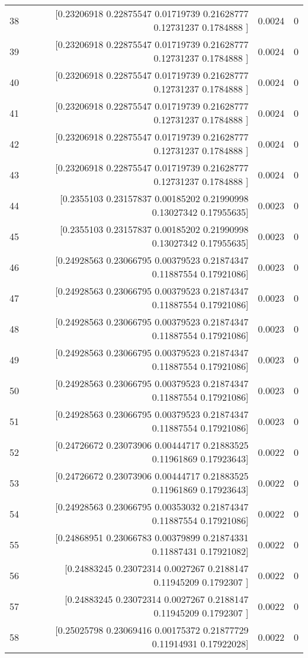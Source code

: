 \begin{longtable}{lrrr}
38 & [0.23206918 0.22875547 0.01719739 0.21628777 0.12731237 0.1784888 ] & 0.0024 & 0 \\
39 & [0.23206918 0.22875547 0.01719739 0.21628777 0.12731237 0.1784888 ] & 0.0024 & 0 \\
40 & [0.23206918 0.22875547 0.01719739 0.21628777 0.12731237 0.1784888 ] & 0.0024 & 0 \\
41 & [0.23206918 0.22875547 0.01719739 0.21628777 0.12731237 0.1784888 ] & 0.0024 & 0 \\
42 & [0.23206918 0.22875547 0.01719739 0.21628777 0.12731237 0.1784888 ] & 0.0024 & 0 \\
43 & [0.23206918 0.22875547 0.01719739 0.21628777 0.12731237 0.1784888 ] & 0.0024 & 0 \\
44 & [0.2355103  0.23157837 0.00185202 0.21990998 0.13027342 0.17955635] & 0.0023 & 0 \\
45 & [0.2355103  0.23157837 0.00185202 0.21990998 0.13027342 0.17955635] & 0.0023 & 0 \\
46 & [0.24928563 0.23066795 0.00379523 0.21874347 0.11887554 0.17921086] & 0.0023 & 0 \\
47 & [0.24928563 0.23066795 0.00379523 0.21874347 0.11887554 0.17921086] & 0.0023 & 0 \\
48 & [0.24928563 0.23066795 0.00379523 0.21874347 0.11887554 0.17921086] & 0.0023 & 0 \\
49 & [0.24928563 0.23066795 0.00379523 0.21874347 0.11887554 0.17921086] & 0.0023 & 0 \\
50 & [0.24928563 0.23066795 0.00379523 0.21874347 0.11887554 0.17921086] & 0.0023 & 0 \\
51 & [0.24928563 0.23066795 0.00379523 0.21874347 0.11887554 0.17921086] & 0.0023 & 0 \\
52 & [0.24726672 0.23073906 0.00444717 0.21883525 0.11961869 0.17923643] & 0.0022 & 0 \\
53 & [0.24726672 0.23073906 0.00444717 0.21883525 0.11961869 0.17923643] & 0.0022 & 0 \\
54 & [0.24928563 0.23066795 0.00353032 0.21874347 0.11887554 0.17921086] & 0.0022 & 0 \\
55 & [0.24868951 0.23066783 0.00379899 0.21874331 0.11887431 0.17921082] & 0.0022 & 0 \\
56 & [0.24883245 0.23072314 0.0027267  0.2188147  0.11945209 0.1792307 ] & 0.0022 & 0 \\
57 & [0.24883245 0.23072314 0.0027267  0.2188147  0.11945209 0.1792307 ] & 0.0022 & 0 \\
58 & [0.25025798 0.23069416 0.00175372 0.21877729 0.11914931 0.17922028] & 0.0022 & 0 \\

\end{longtable}
